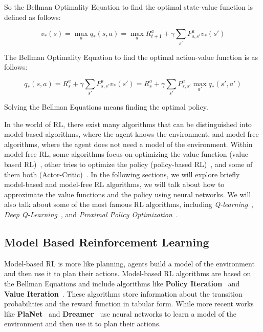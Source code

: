 So the Bellman Optimality Equation to find the optimal state-value function is defined as follows:

\begin{equation} \label{eq:optimal_state_value}
    v_*(s) = \max_{a} q_*(s, a) = \max_{a} R_{t+1}^a + \gamma \sum_{s'} P_{s, s'}^a v_*(s')
\end{equation}

The Bellman Optimality Equation to find the optimal action-value function is as follows:

\begin{equation} \label{eq:optimal_action_value}
    q_*(s, a) = R_s^a + \gamma \sum_{s'} P_{s, s'}^a v_*(s') = R_s^a + \gamma \sum_{s'} P_{s, s'}^a \max_{a'} q_*(s', a')
\end{equation}


Solving the Bellman Equations means finding the optimal policy.

In the world of RL, there exist many algorithms that can be distinguished into model-based algorithms, where the agent knows the environment, and model-free algorithms, where the agent does not need a model of the environment.
Within model-free RL, some algorithms focus on optimizing the value function (value-based RL)~\citep{sutton1988learning}, other tries to optimize the policy (policy-based RL)~\citep{sutton1999policy}, and some of them both (Actor-Critic)~\citep{konda1999actor}.
In the following sections, we will explore briefly model-based and model-free RL algorithms, we will talk about how to approximate the value functions and the policy using neural networks.
We will also talk about some of the most famous RL algorithms, including \textit{Q-learning}~\citep{watkins1992q}, \textit{Deep Q-Learning}~\citep{mnih2013playing}, and \textit{Proximal Policy Optimization}~\citep{schulman2017proximal}.


\subsection{Model Based Reinforcement Learning}
\label{subsec:model_based_rl}
Model-based RL is more like planning, agents build a model of the environment and then use it to plan their actions.
Model-based RL algorithms are based on the Bellman Equations and include algorithms like \textbf{Policy Iteration}~\citep{howard1960dynamic} and \textbf{Value Iteration}~\citep{bellman1966dynamic}.
These algorithms store information about the transition probabilities and the reward function in tabular form.
While more recent works like \textbf{PlaNet}~\citep{hafner2019learning} and \textbf{Dreamer}~\citep{hafner2019dream} use neural networks to learn a model of the environment and then use it to plan their actions.

